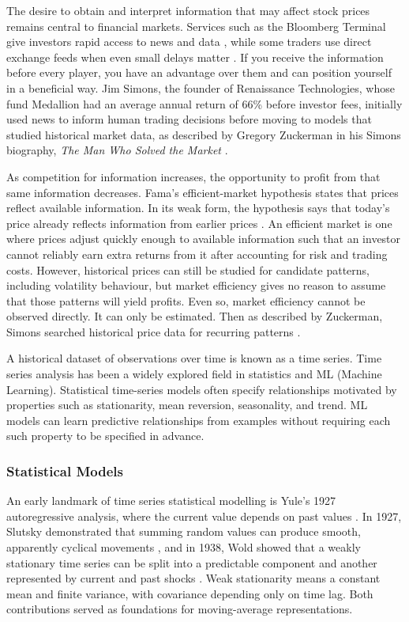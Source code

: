 \documentclass[12pt,a4paper]{article}
\numberwithin{equation}{section}
\numberwithin{table}{section}
\numberwithin{figure}{section}
\begin{document}
The desire to obtain and interpret information that may affect stock prices remains central to financial markets. Services such as the Bloomberg Terminal give investors rapid access to news and data \cite{bloombergterminal}, while some traders use direct exchange feeds when even small delays matter \cite{nasdaqtotalview}. If you receive the information before every player, you have an advantage over them and can position yourself in a beneficial way. Jim Simons, the founder of Renaissance Technologies, whose fund Medallion had an average annual return of 66\% before investor fees, initially used news to inform human trading decisions before moving to models that studied historical market data, as described by Gregory Zuckerman in his Simons biography, \emph{The Man Who Solved the Market} \cite{zuckerman2019}.

As competition for information increases, the opportunity to profit from that same information decreases. Fama's efficient-market hypothesis states that prices reflect available information. In its weak form, the hypothesis says that today's price already reflects information from earlier prices \cite{fama1970}. An efficient market is one where prices adjust quickly enough to available information such that an investor cannot reliably earn extra returns from it after accounting for risk and trading costs. However,  historical prices can still be studied for candidate patterns, including volatility behaviour, but market efficiency gives no reason to assume that those patterns will yield profits. Even so, market efficiency cannot be observed directly. It can only be estimated. Then as described by Zuckerman, Simons searched historical price data for recurring patterns \cite{zuckerman2019}.

A historical dataset of observations over time is known as a time series. Time series analysis has been a widely explored field in statistics and ML (Machine Learning). Statistical time-series models often specify relationships motivated by properties such as stationarity, mean reversion, seasonality, and trend. ML models can learn predictive relationships from examples without requiring each such property to be specified in advance.

\subsubsection{Statistical Models}
An early landmark of time series statistical modelling is Yule's 1927 autoregressive analysis, where the current value depends on past values \cite{yule1927}. In 1927, Slutsky demonstrated that summing random values can produce smooth, apparently cyclical movements \cite{slutsky1927}, and in 1938, Wold showed that a weakly stationary time series can be split into a predictable component and another represented by current and past shocks \cite{wold1938}. Weak stationarity means a constant mean and finite variance, with covariance depending only on time lag. Both contributions served as foundations for moving-average representations.
\end{document}
